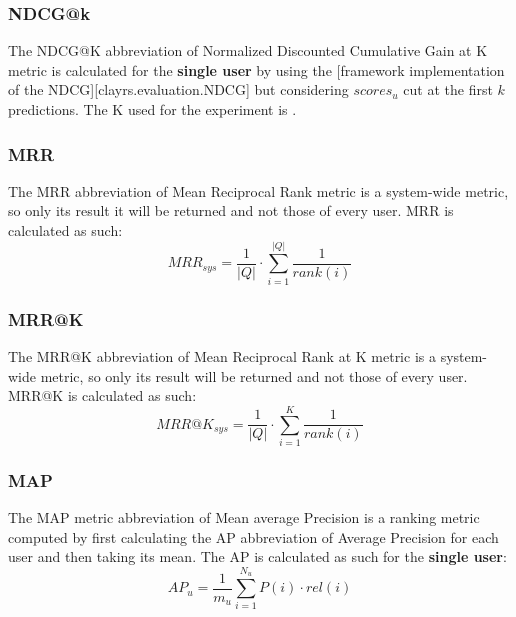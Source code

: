 \documentclass[11pt]{article}
\begin{document}
\subsubsection{NDCG@k}\label{subsubsec:ndcg-k}
The NDCG@K abbreviation of Normalized Discounted Cumulative Gain at K metric is calculated for the \textbf{single user}
by using the [framework implementation of the NDCG][clayrs.evaluation.NDCG] but considering $scores_{u}$ cut at the
first $k$ predictions.
The K used for the experiment is .
\hfill\break


\subsubsection{MRR}\label{subsubsec:mrr}
The MRR abbreviation of Mean Reciprocal Rank metric is a system-wide metric, so only its result it will be returned
and not those of every user.
MRR is calculated as such:
\hfill\break
\hfill\break
    \[
        MRR_{sys} = \frac{1}{|Q|}\cdot\sum_{i=1}^{|Q|}\frac{1}{rank(i)}
    \]
\hfill\break


\subsubsection{MRR@K}\label{subsubsec:mrr-k}
The MRR@K abbreviation of Mean Reciprocal Rank at K metric is a system-wide metric, so only its result will be returned
and not those of every user.
MRR@K is calculated as such:
\hfill\break
\hfill\break
    \[
        MRR@K_{sys} = \frac{1}{|Q|}\cdot\sum_{i=1}^{K}\frac{1}{rank(i)}
    \]
\hfill\break


\subsubsection{MAP}\label{subsubsec:map}
The MAP metric abbreviation of Mean average Precision is a ranking metric computed by first calculating the AP
abbreviation of Average Precision for each user and then taking its mean.
The AP is calculated as such for the \textbf{single user}:
\hfill\break
\hfill\break
    \[
        AP_u = \frac{1}{m_u}\sum_{i=1}^{N_u}P(i)\cdot rel(i)
    \]
\hfill\break



\end{document}
